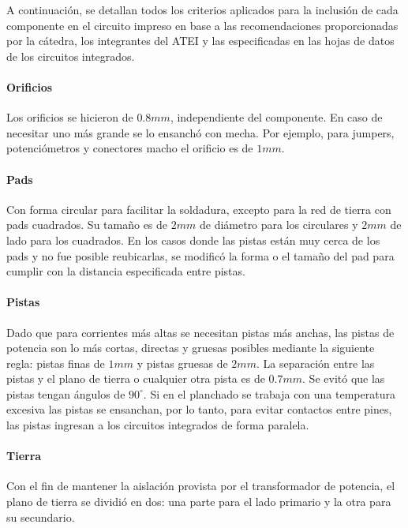 A continuación, se detallan todos los criterios aplicados para la inclusión de cada componente en el circuito impreso en base a las recomendaciones 
proporcionadas por la cátedra, los integrantes del ATEI y las especificadas en las hojas de datos de los circuitos integrados.

\paragraph{Orificios}

Los orificios se hicieron de $0.8mm$, independiente del componente. En caso de necesitar uno más grande se lo ensanchó con mecha.
Por ejemplo, para jumpers, potenciómetros y conectores macho el orificio es de $1mm$. 

\paragraph{Pads}

Con forma circular para facilitar la soldadura, excepto para la red de tierra con pads cuadrados.
Su tamaño es de $2mm$ de diámetro para los circulares y $2mm$ de lado para los cuadrados.
En los casos donde las pistas están muy cerca de los pads y no fue posible reubicarlas,
se modificó la forma o el tamaño del pad para cumplir con la distancia especificada entre pistas.  

\paragraph{Pistas}

Dado que para corrientes más altas se necesitan pistas más anchas, las pistas de potencia son lo más cortas, directas y gruesas posibles mediante la siguiente regla:
pistas finas de $1mm$ y pistas gruesas de $2mm$. 
La separación entre las pistas y el plano de tierra o cualquier otra pista es de $0.7mm$. 
Se evitó que las pistas tengan ángulos de $90^{\circ}$. 
Si en el planchado se trabaja con una temperatura excesiva las pistas se ensanchan, por lo tanto,
para evitar contactos entre pines, las pistas ingresan a los circuitos integrados de forma paralela. 

\paragraph{Tierra} 

Con el fin de mantener la aislación provista por el transformador de potencia, 
el plano de tierra se dividió en dos: una parte para el lado primario y la otra para su secundario.

